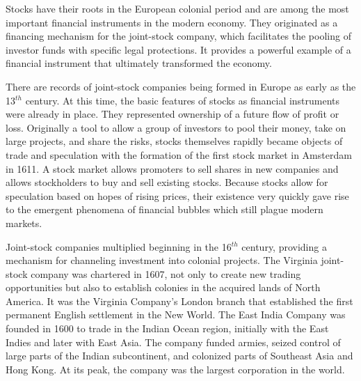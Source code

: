 Stocks have their roots in the European colonial period and are among the most important financial instruments in the modern economy. %
They originated as a financing mechanism for the \gls{joint-stock company},  
which facilitates the pooling of investor funds with specific legal protections. It provides a powerful example of a financial instrument that ultimately transformed the economy. 

There are records of joint-stock companies being formed in Europe as early as the 13$^{th}$ century. At this time, the basic features of stocks as financial instruments were already in place. They represented ownership of a future flow of profit or loss. Originally a tool to allow a group of investors to pool their money, take on large projects, and share the risks, stocks themselves rapidly became objects of trade and speculation with the formation of the first stock market in Amsterdam in 1611. 
A stock market allows promoters to sell shares in new companies and allows stockholders to buy and sell existing stocks. 
Because stocks allow for speculation based on hopes of rising prices, their existence very quickly gave rise to the emergent phenomena of financial bubbles which still plague modern markets. 




Joint-stock companies multiplied beginning in the 16$^{th}$ century, providing a mechanism for channeling investment into colonial projects. The Virginia joint-stock company was chartered in 1607, not only to create new trading opportunities but also to establish colonies in the acquired lands of North America.  It was the Virginia Company's London branch that established the first permanent English settlement in the New World. The East India Company was founded in 1600 to trade in the Indian Ocean region, initially with the East Indies and later with East Asia. The company funded armies, seized control of large parts of the Indian subcontinent, and colonized parts of Southeast Asia and Hong Kong. At its peak, the company was the largest corporation in the world. 

